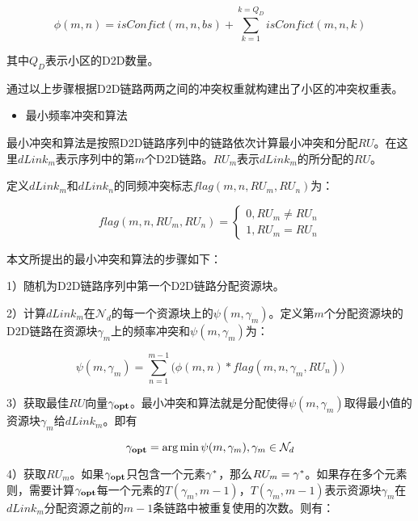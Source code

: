 \documentclass[figurelist,tablelist,algorithmlist,nomlist,masters]{seuthesix}
\begin{document}
	\begin{equation}\label{eq2.5}
	\phi (m,n) = isConfict(m,n,bs) + \sum\limits_{k = 1}^{k = Q_D} {isConfict(m,n,k)}
	\end{equation}
	
	其中$Q_D$表示小区的D2D数量。
	
	通过以上步骤根据D2D链路两两之间的冲突权重就构建出了小区的冲突权重表。
	
	\begin{itemize}
		\item 最小频率冲突和算法
	\end{itemize}
	
	最小冲突和算法是按照D2D链路序列中的链路依次计算最小冲突和分配$RU$。在这里$dLink_m$表示序列中的第$m$个D2D链路。$RU_m$表示$dLink_m$的所分配的$RU$。
	
	定义$dLink_m$和$dLink_n$的同频冲突标志$flag(m,n,RU_m,RU_n)$为：
	
	\begin{equation}\label{eq2.6}
	flag(m,n,RU_m,RU_n) = \left\{ \begin{array}{l} 0,RU_m \ne RU_n\\1,RU_m = RU_n\end{array} \right.
	\end{equation}
	
	
	
	本文所提出的最小冲突和算法的步骤如下：
	
	1）随机为D2D链路序列中第一个D2D链路分配资源块。
	
	2）计算$dLink_m$在$\mathcal{N}_d$的每一个资源块上的$\psi (m,\gamma _m)$。定义第$m$个分配资源块的D2D链路在资源块$\gamma _m$上的频率冲突和$\psi (m,\gamma _m)$为：
	
	\begin{equation}\label{eq2.7}
	\psi (m,\gamma _m) = \sum\limits_{n = 1}^{m - 1} {(\phi (m,n)} *flag(m,n,\gamma _m,RU_n))
	\end{equation}
	
	3）获取最佳$RU$向量${\bf{\gamma _{opt}}}$。最小冲突和算法就是分配使得$\psi (m,\gamma _m)$取得最小值的资源块$\gamma _m$给$dLink_m$。即有
	
	\begin{equation}\label{eq2.8}
	{\bf{\gamma _{opt}}} = \arg \min \psi (m,\gamma _m) , \gamma _m \in \mathcal{N}_d
	\end{equation}
	
	4）获取$RU_m$。如果${\bf{\gamma _{opt}}}$只包含一个元素${\gamma ^{\rm{*}}}$，那么$RU_m = {\gamma ^{\rm{*}}}$。如果存在多个元素则，需要计算${\bf{\gamma _{opt}}}$每一个元素的$T(\gamma _m,m - 1)$，$T(\gamma _m,m - 1)$表示资源块$\gamma _m$在$dLink_m$分配资源之前的$m-1$条链路中被重复使用的次数。则有：
	
\end{document}
